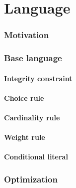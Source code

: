 \part{Language}
\section{Motivation}

\section{Base language}
\subsection{Integrity constraint}

\subsection{Choice rule}

\subsection{Cardinality rule}

\subsection{Weight rule}

\subsection{Conditional literal}

\section{Optimization}


